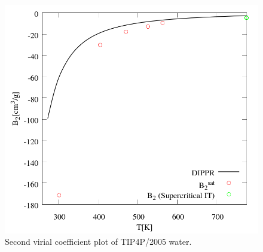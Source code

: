 \documentclass[%
 aip,
 jcp,
 sd,%
 amsmath,amssymb,
]{revtex4-1}
\begin{document}
\begin{figure}[!htbp]
\includegraphics[scale=0.35]{Figures/EXAMPLE-SIM_TIP4P05_b2.png}
\caption{Second virial coefficient plot of TIP4P/2005 water.}
\label{fig:EXAMPLE-SIM/TIP4P05/b2}
\end{figure}

\newpage
\clearpage

\end{document}
